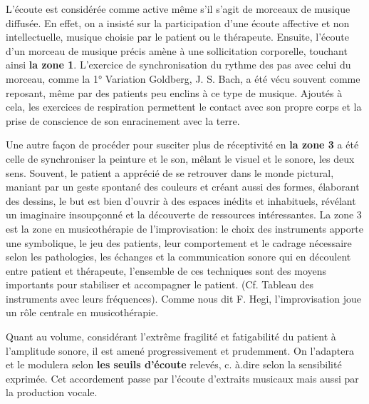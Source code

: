 L'écoute est considérée comme active même s'il s'agit de morceaux de musique diffusée. En effet,  on a 
insisté sur la participation d'une écoute affective et non intellectuelle, 
musique choisie par le patient ou le thérapeute.
Ensuite, l'écoute d'un morceau de musique précis amène à une sollicitation corporelle, touchant 
ainsi  \textbf{la zone 1}. 
L'exercice de synchronisation du rythme des pas avec celui du morceau, comme  la 1° 
Variation Goldberg, J. S. Bach,  a été vécu souvent comme reposant, même par des patients peu 
enclins à ce type 
de musique. Ajoutés à cela, les exercices de respiration 
permettent le contact avec 
son propre corps et la prise de conscience de son enracinement avec la terre.


Une autre façon de procéder pour susciter plus de réceptivité en  \textbf{la zone 3} a été celle de 
synchroniser la 
peinture et 
le son, mêlant le visuel et le sonore, les deux sens.  Souvent, le patient a apprécié de se 
retrouver dans le monde 
pictural, maniant  par un geste spontané des couleurs et créant aussi des formes, élaborant des dessins,
le but est bien d'ouvrir à des espaces inédits et  inhabituels, révélant un imaginaire insoupçonné et 
la découverte de ressources intéressantes.
La zone 3 est la zone en musicothérapie de l'improvisation: le choix des instruments apporte une 
symbolique, 
le jeu des patients, leur comportement et  le cadrage nécessaire selon les pathologies, les 
échanges et la communication sonore qui en découlent entre patient et thérapeute, l'ensemble de ces 
techniques sont des moyens importants pour stabiliser et accompagner le patient.
(Cf. Tableau des instruments avec leurs fréquences). Comme nous dit F. Hegi, l'improvisation joue un 
rôle centrale en musicothérapie.\autocite {hegi_improvisation_1993}
  

Quant au volume, considérant l'extrême fragilité et fatigabilité du patient à l'amplitude sonore, 
il est amené progressivement et prudemment.
On l'adaptera et le modulera selon 
\textbf{les seuils 
d'écoute} relevés, c. à.dire selon la sensibilité exprimée.
Cet accordement passe par l'écoute d'extraits musicaux mais aussi par  la production vocale.



